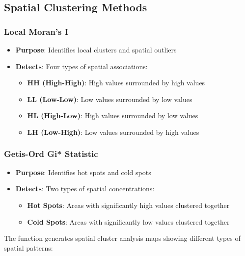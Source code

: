 \documentclass{article}
\begin{document}
\subsection{Spatial Clustering Methods}

\subsubsection{Local Moran's I}
\begin{itemize}
    \item \textbf{Purpose}: Identifies local clusters and spatial outliers
    \item \textbf{Detects}: Four types of spatial associations:
    \begin{itemize}
        \item \textbf{HH (High-High)}: High values surrounded by high values
        \item \textbf{LL (Low-Low)}: Low values surrounded by low values  
        \item \textbf{HL (High-Low)}: High values surrounded by low values
        \item \textbf{LH (Low-High)}: Low values surrounded by high values
    \end{itemize}
\end{itemize}

\subsubsection{Getis-Ord Gi* Statistic}
\begin{itemize}
    \item \textbf{Purpose}: Identifies hot spots and cold spots
    \item \textbf{Detects}: Two types of spatial concentrations:
    \begin{itemize}
        \item \textbf{Hot Spots}: Areas with significantly high values clustered together
        \item \textbf{Cold Spots}: Areas with significantly low values clustered together
    \end{itemize}
\end{itemize}

The function generates spatial cluster analysis maps showing different types of spatial patterns:
\end{document}
